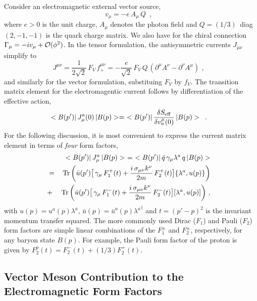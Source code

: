 Consider an electromagnetic external vector source,
\begin{equation}
v_\mu = - e \, A_\mu \, Q \, \, \, ,
\label{vem}
\end{equation}
where $e > 0$ is the unit charge, $A_\mu$ denotes the photon field and
$Q= (1/3) \,$ diag$(2,-1,-1)$ is the quark charge matrix. We also
have for the chiral connection $\Gamma_\mu = -i v_\mu +{\cal
  O}(\phi^2)$. In the tensor formulation, the antisymmetric currents
$J_{\mu \nu}$ simplify to
\begin{equation}
J^{\mu \nu} = \frac{1}{2 \sqrt{2}} \, F_V \, f_+^{\mu \nu} =
- \frac{e}{\sqrt{2}} \, F_V \, Q \, (\partial^\mu A^\nu -
\partial^\nu A^\mu ) \, \, ,
\label{jmunuem}
\end{equation}
and similarly for the vector formulation, substituing $F_V$ by $f_V$.
The transition matrix element for the electromagentic current follows
by differentiation of the effective action,
\begin{equation}
<B(p') | \, J_\mu^a (0) \, | B(p)> = \,
\,  <B(p') | \,  \frac{\delta S_{\rm eff}}{\delta v^\mu_a (0)}
\, | B(p)>
 \, \, \, .
\label{jmuseff}
\end{equation}
For the following discussion, it is most convenient to express the
current matrix element in terms of {\it four} form
factors,
\begin{eqnarray}
& & <B(p') | \, J_\mu^a \, | B(p)> \, \, = \, \,
<B(p') | \, \bar{q} \, \gamma_\mu \lambda^a \, q \,
| B(p)>\nonumber \\
& = & {\rm Tr} \, \biggl( \bar{u} (p') \bigl[ \, \gamma_\mu \, F_1^+ (t) +
\frac{i \, \sigma_{\mu \nu}k^\nu}{2m} \, F_2^+ (t) \bigr] \{ \lambda^a
, u(p) \} \biggr) \nonumber \\
& + & {\rm Tr} \, \biggl( \bar{u} (p') \bigl[ \, \gamma_\mu \, F_1^- (t) +
\frac{i \, \sigma_{\mu \nu}k^\nu}{2m} \, F_2^- (t) \bigr] [ \lambda^a
, u(p) ] \biggr)  \, \, ,
\label{ffdef}
\end{eqnarray}
with $u(p) = u^a (p) \lambda^a$, $\bar{u}(p) = \bar{u}^a (p)
{\lambda^a}^\dagger$ and $t = (p'-p)^2$ is the invariant momentum
transfer squared. The more commonly used Dirac ($F_1$) and Pauli
($F_2$) form factors are simple linear combinations of the $F_1^\pm$
and $F_2^\pm$, respectively, for any baryon state $B(p)$. For example,
the Pauli form factor of the proton is given by
$F_2^p (t)= F_2^- (t) + (1/3) F_2^+ (t)$.

\subsection{Vector Meson Contribution to the Electromagnetic Form Factors}

